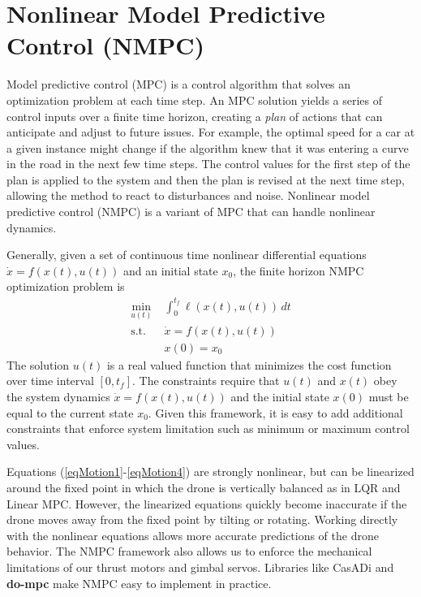 \documentclass[]{article}
\newcommand{\mpc}{MPC}
\newcommand{\nmpc}{NMPC}
\newcommand{\casadi}{CasADi}
\newcommand{\dompc}{{\bf do-mpc}}
\begin{document}
	


\section*{Nonlinear Model Predictive Control (NMPC)}

	Model predictive control (\mpc) is a control algorithm that solves an optimization problem at each time step.
	An {\mpc} solution yields a series of control inputs over a finite time horizon, creating a {\em plan} of actions that can anticipate and adjust to future issues. For example, the optimal speed for a car at a given instance might change if the algorithm knew that it was entering a curve in the road in the next few time steps. The control values for the first step of the plan is applied to the system and then the plan is revised at the next time step, allowing the method to react to disturbances and noise. Nonlinear model predictive control (\nmpc) is a variant of {\mpc} that can handle nonlinear dynamics. 

	Generally, given a set of continuous time nonlinear differential equations $\dot{x} = f(x(t),u(t))$  and an initial state $x_0$, the finite horizon {\nmpc} optimization problem is
	\begin{align*}
		\min_{u(t)} \; & \int_{0}^{t_f} \ell(x(t),u(t))\,dt  \\
		\text{s.t.} \;\; & \dot{x} =  f(x(t),u(t)) \\
		& x(0) = x_0 
	\end{align*}
	The solution $u(t)$ is a real valued function that minimizes the cost function over time interval $[0, t_f]$. The constraints require that  $u(t)$ and $x(t)$ obey the system dynamics $\dot{x} =  f(x(t),u(t)) $ and the  initial state $x(0)$ must be equal to the current state $x_0$.   Given this framework, it is easy to add additional constraints that enforce system limitation such as minimum or maximum control values.

	 Equations (\ref{eqMotion1}-\ref{eqMotion4}) are strongly nonlinear, but can be linearized around the fixed point in which the drone is vertically balanced as in LQR and Linear {\mpc}.  However, the linearized equations quickly become inaccurate if the drone moves away from the fixed point by tilting or rotating.  Working directly with the nonlinear equations allows more accurate predictions of the drone behavior. The {\nmpc} framework also allows us to enforce the mechanical limitations of our thrust motors and gimbal servos.  Libraries like {\casadi} \citep{casadi} and {\dompc} \citep{do-mpc} make {\nmpc} easy to implement in practice.
 
\end{document}
